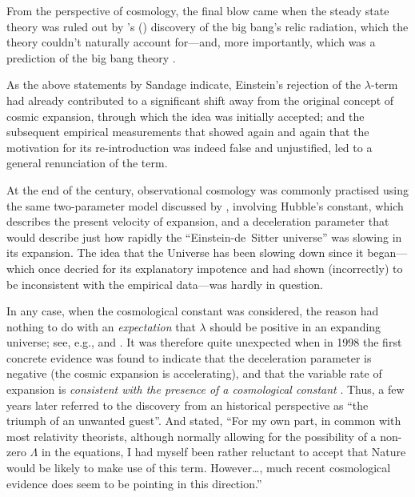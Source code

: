 \documentclass[12 pt]{article}
\def\citeapos#1{\citeauthor{#1}'s (\citeyear{#1})}
\begin{document}
From the perspective of cosmology, the final blow came when the steady state theory was ruled out by \citeapos{Penzias1965} discovery of the big bang's relic radiation, which the theory couldn't naturally account for---and, more importantly, which was a prediction of the big bang theory \citep{Gamow1946,Alpher1948a,Gamow1948,Alpher1948b,Alpher1950}.

As the above statements by Sandage indicate, Einstein's rejection of the $\lambda$-term had already contributed to a significant shift away from the original concept of cosmic expansion, through which the idea was initially accepted; and the subsequent empirical measurements that showed again and again that the motivation for its re-introduction was indeed false and unjustified, led to a general renunciation of the term. 

At the end of the century, observational cosmology was commonly practised using the same two-parameter model discussed by \citet{Sandage1958}, involving Hubble's constant, which describes the present velocity of expansion, and a deceleration parameter that would describe just how rapidly the ``Einstein-de~Sitter universe'' was slowing in its expansion. The idea that the Universe has been slowing down since it began---which \citet{Eddington1933} once decried for its explanatory impotence and \citet{Lemaitre1933} had shown (incorrectly) to be inconsistent with the empirical data---was hardly in question. 

In any case, when the cosmological constant was considered, the reason had nothing to do with an \textit{expectation} that $\lambda$ should be positive in an expanding universe; see, e.g., \citet{Carroll1992} and \citet{Goobar1995}. It was therefore quite unexpected when in 1998 the first concrete evidence was found to indicate that the deceleration parameter is negative (the cosmic expansion is accelerating), and that the variable rate of expansion is \textit{consistent with the presence of a cosmological constant} \citep{Riess1998,Perlmutter1999}. Thus, a few years later \citet{Ellis2003} referred to the discovery from an historical perspective as ``the triumph of an unwanted guest''. And \citet{Penrose2005} stated, ``For my own part, in common with most relativity theorists, although normally allowing for the possibility of a non-zero $\Lambda$ in the equations, I had myself been rather reluctant to accept that Nature would be likely to make use of this term. However\ldots, much recent cosmological evidence does seem to be pointing in this direction.'' 
\end{document}
